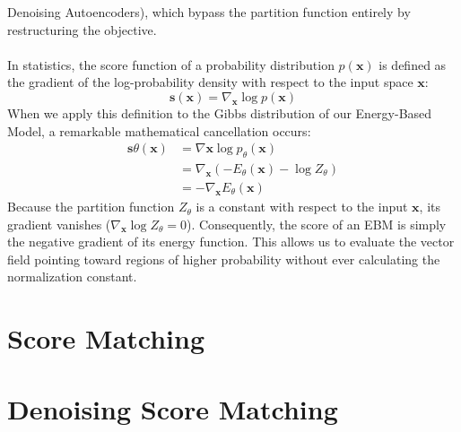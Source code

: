 Denoising Autoencoders), which bypass the partition function entirely by restructuring the objective. \\
\\
In statistics, the score function of a probability distribution $p(\mathbf{x})$ is defined as the gradient of the log-probability 
density with respect to the input space $\mathbf{x}$: 
\begin{equation}
    \mathbf{s}(\mathbf{x}) = \nabla_{\mathbf{x}} \log p(\mathbf{x})
\end{equation}
When we apply this definition to the Gibbs distribution of our Energy-Based Model, a remarkable mathematical cancellation occurs:
\begin{align}
    \mathbf{s}{\theta}(\mathbf{x}) &= \nabla{\mathbf{x}} \log p_{\theta}(\mathbf{x}) \\
    &= \nabla_{\mathbf{x}} \left( -E_{\theta}(\mathbf{x}) - \log Z_{\theta} \right) \\
    &= -\nabla_{\mathbf{x}} E_{\theta}(\mathbf{x})
\end{align}
Because the partition function $Z_{\theta}$ is a constant with respect to the input $\mathbf{x}$, its gradient vanishes 
($\nabla_{\mathbf{x}} \log Z_{\theta} = 0$). Consequently, the score of an EBM is simply the negative gradient of its energy function. 
This allows us to evaluate the vector field pointing toward regions of higher probability without ever calculating the normalization 
constant.  

\section{Score Matching} 


\section{Denoising Score Matching} 






